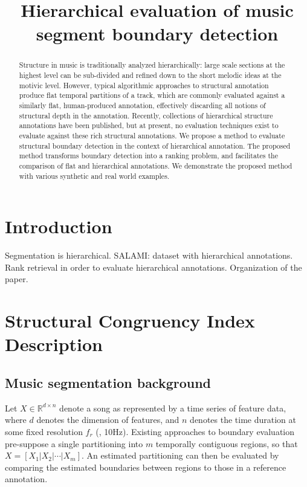 \documentclass{article}
\title{Hierarchical evaluation of music segment boundary detection}
\begin{document}
%
\maketitle
%
\begin{abstract}
Structure in music is traditionally analyzed hierarchically: large scale sections at the highest level can be sub-divided and refined down to the short melodic ideas at the motivic level. 
However, typical algorithmic approaches to structural annotation produce flat temporal partitions of a track, which are commonly evaluated against a similarly flat, human-produced
annotation, effectively discarding all notions of structural depth in the annotation.
Recently, collections of hierarchical structure annotations have been published, but at present, no evaluation techniques exist to evaluate against these rich structural annotations.
We propose a method to evaluate structural boundary detection in the context of hierarchical annotation.
The proposed method transforms boundary detection into a ranking problem, and facilitates the comparison of flat and hierarchical annotations.
We demonstrate the proposed method with various synthetic and real world examples. 
\end{abstract}
%
\section{Introduction}\label{sec:introduction}

Segmentation is hierarchical.
SALAMI: dataset with hierarchical annotations.
Rank retrieval in order to evaluate hierarchical annotations.
Organization of the paper.

\section{Structural Congruency Index Description}\label{sec:eval_desc}

\subsection{Music segmentation background}

Let $X \in \mathbb{R}^{d\times n}$ denote a song as represented by a time series of 
feature data, where $d$ denotes the dimension of features, and $n$ denotes the
time duration at some fixed resolution $f_r$ (\eg, 10Hz).
Existing approaches to boundary evaluation pre-suppose a single partitioning into $m$
temporally contiguous regions, so that $X=[X_1|X_2|\cdots|X_m]$.  An estimated
partitioning can then be evaluated by comparing the estimated boundaries between
regions to those in a reference annotation.
\end{document}
